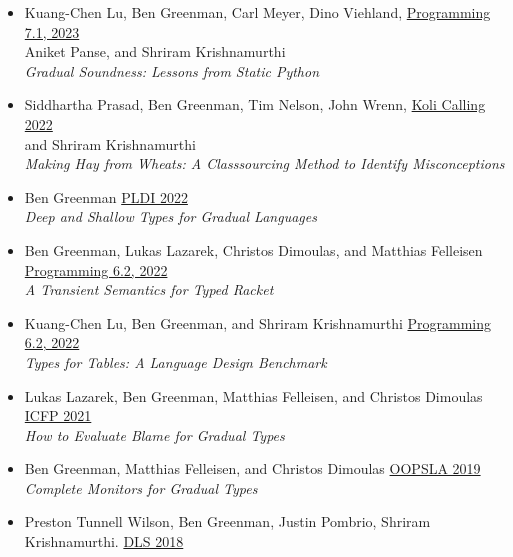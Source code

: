 \documentclass[11pt]{article}
\begin{document}
\begin{itemize}
\item
  Kuang-Chen Lu, Ben Greenman, Carl Meyer, Dino Viehland, \hfill \href{https://2023.programming-conference.org/}{Programming 7.1, 2023} \\
  Aniket Panse, and Shriram Krishnamurthi \\
    \emph{Gradual Soundness: Lessons from Static Python} \hfill {}
\item
  Siddhartha Prasad, Ben Greenman, Tim Nelson, John Wrenn, \hfill \href{https://www.kolicalling.fi/}{Koli Calling 2022} \\
  and Shriram Krishnamurthi \\
    \emph{Making Hay from Wheats: A Classsourcing Method to Identify Misconceptions} \hfill {}
\item
  Ben Greenman \hfill \href{https://pldi22.sigplan.org/}{PLDI 2022} \\
    \emph{Deep and Shallow Types for Gradual Languages} \hfill {}
\item
  Ben Greenman, Lukas Lazarek, Christos Dimoulas, and Matthias Felleisen \hfill \href{https://2022.programming-conference.org/}{Programming 6.2, 2022} \\
    \emph{A Transient Semantics for Typed Racket} \hfill {} %
\item
  Kuang-Chen Lu, Ben Greenman, and Shriram Krishnamurthi \hfill \href{https://2022.programming-conference.org/}{Programming 6.2, 2022} \\
    \emph{Types for Tables: A Language Design Benchmark} \hfill {}
\item
  Lukas Lazarek, Ben Greenman, Matthias Felleisen, and Christos Dimoulas \hfill \href{https://icfp21.sigplan.org/}{ICFP 2021} \\
  \emph{How to Evaluate Blame for Gradual Types} \hfill {} %
\item
  Ben Greenman, Matthias Felleisen, and Christos Dimoulas \hfill \href{https://conf.researchr.org/track/splash-2019/splash-2019-OOPSLA}{OOPSLA 2019} \\
  \emph{Complete Monitors for Gradual Types} \hfill {}
\item
  Preston Tunnell Wilson, Ben Greenman, Justin Pombrio, Shriram Krishnamurthi. \hfill \href{https://conf.researchr.org/track/dls-2018/dls-2018}{DLS 2018} \\

\end{itemize}
\end{document}
